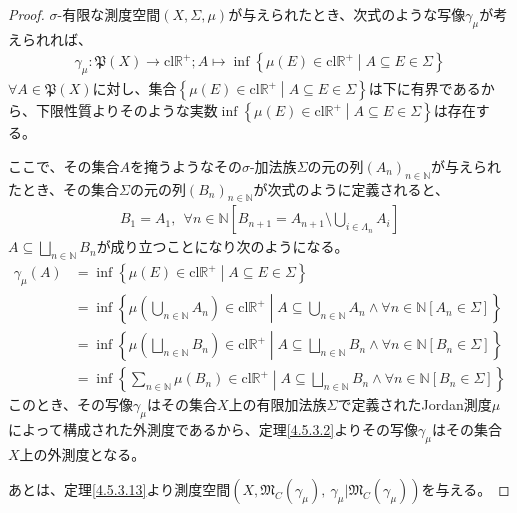\documentclass[dvipdfmx]{jsarticle}
\begin{document}
\begin{proof}
$\sigma$-有限な測度空間$(X,\varSigma,\mu)$が与えられたとき、次式のような写像$\gamma_{\mu}$が考えられれば、
\begin{align*}
\gamma_{\mu}\mathfrak{:P}(X) \rightarrow \mathrm{cl}\mathbb{R}^{+};A \mapsto \inf\left\{ \mu(E) \in \mathrm{cl}\mathbb{R}^{+} \middle| A \subseteq E \in \varSigma \right\}
\end{align*}
$\forall A \in \mathfrak{P}(X)$に対し、集合$\left\{ \mu(E) \in \mathrm{cl}\mathbb{R}^{+} \middle| A \subseteq E \in \varSigma \right\}$は下に有界であるから、下限性質よりそのような実数$\inf\left\{ \mu(E) \in \mathrm{cl}\mathbb{R}^{+} \middle| A \subseteq E \in \varSigma \right\}$は存在する。\par
ここで、その集合$A$を掩うようなその$\sigma$-加法族$\varSigma$の元の列$\left( A_{n} \right)_{n \in \mathbb{N}}$が与えられたとき、その集合$\varSigma$の元の列$\left( B_{n} \right)_{n \in \mathbb{N}}$が次式のように定義されると、
\begin{align*}
B_{1} = A_{1},\ \ \forall n \in \mathbb{N}\left[ B_{n + 1} = A_{n + 1} \setminus \bigcup_{i \in \varLambda_{n}} A_{i} \right]
\end{align*}
$A \subseteq \bigsqcup_{n \in \mathbb{N}} B_{n}$が成り立つことになり次のようになる。
\begin{align*}
\gamma_{\mu}(A) &= \inf\left\{ \mu(E) \in \mathrm{cl}\mathbb{R}^{+} \middle| A \subseteq E \in \varSigma \right\}\\
&= \inf\left\{ \mu\left( \bigcup_{n \in \mathbb{N}} A_{n} \right) \in \mathrm{cl}\mathbb{R}^{+} \middle| A \subseteq \bigcup_{n \in \mathbb{N}} A_{n} \land \forall n \in \mathbb{N}\left[ A_{n} \in \varSigma \right] \right\}\\
&= \inf\left\{ \mu\left( \bigsqcup_{n \in \mathbb{N}} B_{n} \right) \in \mathrm{cl}\mathbb{R}^{+} \middle| A \subseteq \bigsqcup_{n \in \mathbb{N}} B_{n} \land \forall n \in \mathbb{N}\left[ B_{n} \in \varSigma \right] \right\}\\
&= \inf\left\{ \sum_{n \in \mathbb{N}} {\mu\left( B_{n} \right)} \in \mathrm{cl}\mathbb{R}^{+} \middle| A \subseteq \bigsqcup_{n \in \mathbb{N}} B_{n} \land \forall n \in \mathbb{N}\left[ B_{n} \in \varSigma \right] \right\}
\end{align*}
このとき、その写像$\gamma_{\mu}$はその集合$X$上の有限加法族$\varSigma$で定義されたJordan測度$\mu$によって構成された外測度であるから、定理\ref{4.5.3.2}よりその写像$\gamma_{\mu}$はその集合$X$上の外測度となる。\par
あとは、定理\ref{4.5.3.13}より測度空間$\left( X,\mathfrak{M}_{C}\left( \gamma_{\mu} \right),\ \gamma_{\mu}|\mathfrak{M}_{C}\left( \gamma_{\mu} \right) \right)$を与える。
\end{proof}
\end{document}
